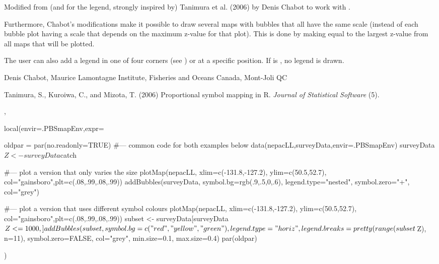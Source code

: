 \documentclass[letterpaper]{book}
\begin{document}
%
\begin{Details}\relax
Modified from (and for the legend, strongly inspired by) Tanimura
et al. (2006) by Denis Chabot to work with .

Furthermore, Chabot's modifications make it possible to draw
several maps with bubbles that all have the same scale
(instead of each bubble plot having a scale that depends on
the maximum z-value for that plot). This is done by making
 equal to the largest z-value from all maps that will be
plotted.

The user can also add a legend in one of four corners
(see ) or at a specific  position.
If  is , no legend is drawn.
\end{Details}
%
\begin{Author}\relax
Denis Chabot, Maurice Lamontagne Institute, Fisheries and Oceans Canada, Mont-Joli QC
\end{Author}
%
\begin{References}\relax
Tanimura, S., Kuroiwa, C., and Mizota, T. (2006)
Proportional symbol mapping in R.
\emph{Journal of Statistical Software} (5).
\end{References}
%
\begin{SeeAlso}\relax
{}, 
\end{SeeAlso}
%
\begin{Examples}
\begin{ExampleCode}
local(envir=.PBSmapEnv,expr={
  oldpar = par(no.readonly=TRUE)
  #--- common code for both examples below
  data(nepacLL,surveyData,envir=.PBSmapEnv)
  surveyData$Z <- surveyData$catch

  #--- plot a version that only varies the size
  plotMap(nepacLL, xlim=c(-131.8,-127.2), ylim=c(50.5,52.7),
    col="gainsboro",plt=c(.08,.99,.08,.99))
  addBubbles(surveyData, symbol.bg=rgb(.9,.5,0,.6),
    legend.type="nested", symbol.zero="+", col="grey")

  #--- plot a version that uses different symbol colours
  plotMap(nepacLL, xlim=c(-131.8,-127.2), ylim=c(50.5,52.7),
  col="gainsboro",plt=c(.08,.99,.08,.99))
  subset <- surveyData[surveyData$Z <= 1000, ]
  addBubbles(subset, symbol.bg=c("red", "yellow", "green"),
    legend.type="horiz", legend.breaks=pretty(range(subset$Z), n=11),
    symbol.zero=FALSE, col="grey", min.size=0.1, max.size=0.4)
  par(oldpar)
})
\end{ExampleCode}
\end{Examples}
\end{document}
